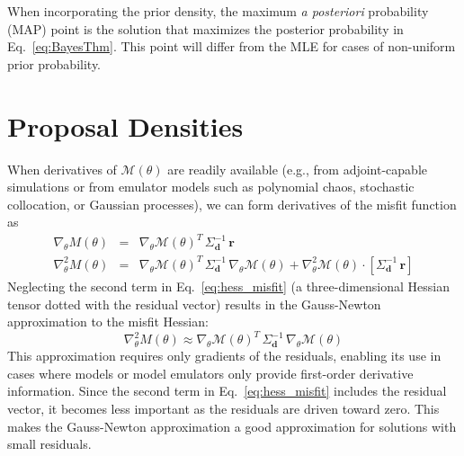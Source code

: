 When incorporating the prior density, the maximum {\it a posteriori}
probability (MAP) point is the solution that maximizes the posterior
probability in Eq.~\ref{eq:BayesThm}.  This point will differ
from the MLE for cases of non-uniform prior probability.


\section{Proposal Densities} \label{uq:bayes:prop}

When derivatives of $\mathcal{M}(\theta)$ are readily available (e.g.,
from adjoint-capable simulations or from emulator models such as
polynomial chaos, stochastic collocation, or Gaussian processes), we
can form derivatives of the misfit function as
\begin{eqnarray}
\nabla_\theta M(\theta) &=& \nabla_\theta \mathcal{M}(\theta)^T\,\Sigma_{\mathbf{d}}^{-1}\,\boldsymbol{r} \label{eq:grad_misfit} \\
\nabla^2_\theta M(\theta) &=& \nabla_\theta \mathcal{M}(\theta)^T\,\Sigma_{\mathbf{d}}^{-1}\,\nabla_\theta \mathcal{M}(\theta) + \nabla^2_\theta \mathcal{M}(\theta) \cdot \left[\Sigma_{\mathbf{d}}^{-1}\,\boldsymbol{r}\right] \label{eq:hess_misfit}
\end{eqnarray}
Neglecting the second term in Eq.~\ref{eq:hess_misfit} (a
three-dimensional Hessian tensor dotted with the residual vector)
results in the Gauss-Newton approximation to the misfit Hessian:
\begin{equation}
\nabla^2_\theta M(\theta) \approx \nabla_\theta \mathcal{M}(\theta)^T\,\Sigma_{\mathbf{d}}^{-1}\,\nabla_\theta \mathcal{M}(\theta) \label{eq:hess_misfit_gn}
\end{equation}
This approximation requires only gradients of the residuals, enabling
its use in cases where models or model emulators only provide
first-order derivative information.  Since the second term in
Eq.~\ref{eq:hess_misfit} includes the residual vector, it becomes less
important as the residuals are driven toward zero.  This makes the
Gauss-Newton approximation a good approximation for solutions with
small residuals.

